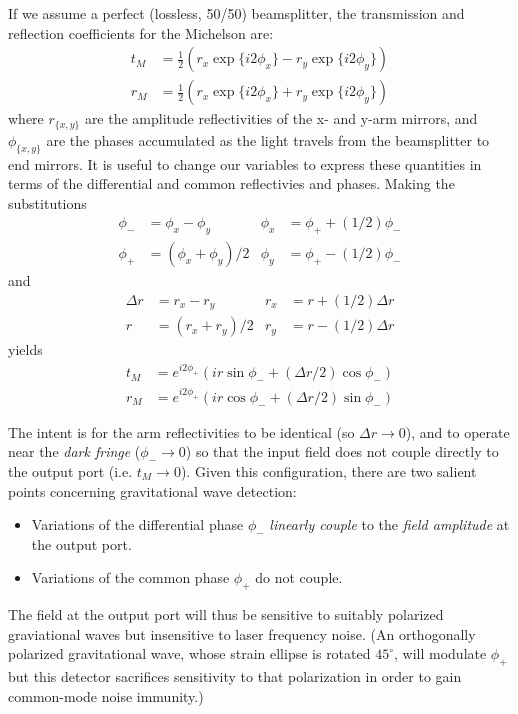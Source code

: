If we assume a perfect (lossless, 50/50) beamsplitter, the
transmission and reflection coefficients for the Michelson are:
%
\begin{align}
t_M  &= \frac{1}{2}\left(r_x \exp \{i2\phi_x\} - r_y \exp\{i2\phi_y\} \right) \\
r_M  &= \frac{1}{2}\left(r_x \exp \{i2\phi_x\} + r_y \exp\{i2\phi_y\} \right)
\end{align}
where $r_{\{x,y\}}$ are the amplitude reflectivities of the x- and y-arm mirrors, and $\phi_{\{x,y\}}$ are 
the phases accumulated as the light travels from the beamsplitter to end mirrors.  It is useful to change
our variables to express these quantities in terms of the differential and common reflectivies and phases.
Making the substitutions
\begin{align}
\phi_- &= \phi_x - \phi_y       &  \phi_x &= \phi_+ + (1/2)\phi_- \\
\phi_+ &= (\phi_x + \phi_y)/2   &  \phi_y &= \phi_+ - (1/2)\phi_-
\end{align}
and
\begin{align}
  \Delta r & = r_x - r_y        &  r_x   &= r + (1/2)\Delta r \\
       r & = (r_x + r_y)/2      &  r_y   &= r - (1/2)\Delta r
\end{align}
yields
\begin{align}
t_M  &= e^{i2\phi_+} \left( i r\sin \phi_- + (\Delta r/2) \cos \phi_- \right) 
\label{eq:michelson-transmission}\\
r_M  &= e^{i2\phi_+} \left( i r \cos \phi_- + (\Delta r/2) \sin \phi_- \right) 
\end{align}

The intent is for the arm reflectivities to be identical (so $\Delta r \to
0$), and to operate near the \emph{dark fringe} ($\phi_-\to0$) so that
the input field does not couple directly to the output port
(i.e. $t_M\to0$).  Given this configuration, there are two salient
points concerning gravitational wave detection:
%
\begin{itemize}
\item Variations of the differential phase $\phi_-$ \emph{linearly couple} to the \emph{field amplitude} at the output port.
\item Variations of the common phase $\phi_+$ do not couple.
\end{itemize}
%
The field at the output port will thus be sensitive to suitably
polarized graviational waves but insensitive to laser frequency noise.
(An orthogonally polarized gravitational wave, whose strain ellipse is
rotated $45^\circ$, will modulate $\phi_+$ but this detector
sacrifices sensitivity to that polarization in order to gain
common-mode noise immunity.)  

